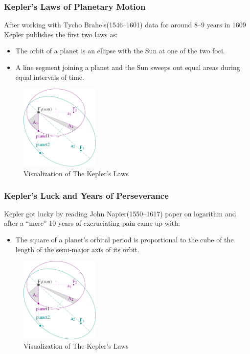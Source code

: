     \begin{frame}
      \frametitle{Kepler's Laws of Planetary Motion}
      \pause
      After working with Tycho Brahe's(1546--1601) data for around 8--9 years in 1609 Kepler publishes the first two laws as:
      \begin{itemize}
        \pause
        \item The orbit of a planet is an ellipse with the Sun at one of the two foci.
        \pause
        \item A line segment joining a planet and the Sun sweeps out equal areas during equal intervals of time.
      \end{itemize}
      \pause
        \begin{figure}
          \centering
          \includegraphics[width=0.35\textwidth]{./data/image/kepler_laws_diagram.pdf}
        \caption{Visualization of The Kepler's Laws}
        \end{figure}
      \end{frame}
      \begin{frame}
        \frametitle{Kepler's Luck and Years of Perseverance}
        \pause
        Kepler got lucky by reading John Napier(1550--1617) paper on logarithm and after a ``mere'' 10 years of 
        excruciating pain came up with:
        \begin{itemize}
            \pause
          \item The square of a planet's orbital period is proportional to the cube of the length of the semi-major axis of its orbit.
        \end{itemize}
        \pause
          \begin{figure}
            \centering
            \includegraphics[width=0.35\textwidth]{./data/image/kepler_laws_diagram.pdf}
          \caption{Visualization of The Kepler's Laws}
          \label{image:kepler_luck_napier}
          \end{figure}
        \end{frame}
     
